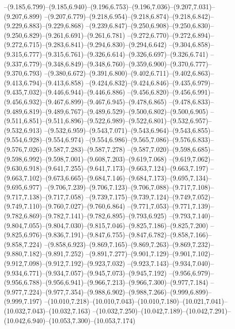   --(9.185,6.799)--(9.185,6.940)--(9.196,6.753)--(9.196,7.036)--(9.207,7.031)--(9.207,6.899)%
  --(9.207,6.779)--(9.218,6.954)--(9.218,6.874)--(9.218,6.842)--(9.229,6.883)--(9.229,6.868)%
  --(9.239,6.847)--(9.250,6.908)--(9.250,6.830)--(9.250,6.829)--(9.261,6.691)--(9.261,6.781)%
  --(9.272,6.770)--(9.272,6.894)--(9.272,6.715)--(9.283,6.841)--(9.294,6.830)--(9.294,6.642)%
  --(9.304,6.858)--(9.315,6.777)--(9.315,6.761)--(9.326,6.614)--(9.326,6.697)--(9.326,6.741)%
  --(9.337,6.779)--(9.348,6.849)--(9.348,6.760)--(9.359,6.900)--(9.370,6.777)--(9.370,6.793)%
  --(9.380,6.672)--(9.391,6.800)--(9.402,6.711)--(9.402,6.863)--(9.413,6.794)--(9.413,6.858)%
  --(9.424,6.832)--(9.424,6.846)--(9.435,6.979)--(9.435,7.032)--(9.446,6.944)--(9.446,6.886)%
  --(9.456,6.820)--(9.456,6.991)--(9.456,6.932)--(9.467,6.899)--(9.467,6.945)--(9.478,6.865)%
  --(9.478,6.833)--(9.489,6.819)--(9.489,6.767)--(9.489,6.529)--(9.500,6.802)--(9.500,6.905)%
  --(9.511,6.851)--(9.511,6.896)--(9.522,6.989)--(9.522,6.801)--(9.532,6.957)--(9.532,6.913)%
  --(9.532,6.959)--(9.543,7.071)--(9.543,6.964)--(9.543,6.855)--(9.554,6.928)--(9.554,6.974)%
  --(9.554,6.986)--(9.565,7.086)--(9.576,6.833)--(9.576,7.026)--(9.587,7.283)--(9.587,7.278)%
  --(9.587,7.020)--(9.598,6.685)--(9.598,6.992)--(9.598,7.001)--(9.608,7.203)--(9.619,7.068)%
  --(9.619,7.062)--(9.630,6.918)--(9.641,7.255)--(9.641,7.173)--(9.663,7.124)--(9.663,7.197)%
  --(9.663,7.102)--(9.673,6.665)--(9.684,7.146)--(9.684,7.173)--(9.695,7.134)--(9.695,6.977)%
  --(9.706,7.239)--(9.706,7.123)--(9.706,7.088)--(9.717,7.108)--(9.717,7.138)--(9.717,7.058)%
  --(9.739,7.175)--(9.739,7.124)--(9.749,7.052)--(9.749,7.110)--(9.760,7.027)--(9.760,6.864)%
  --(9.771,7.053)--(9.771,7.139)--(9.782,6.869)--(9.782,7.141)--(9.782,6.895)--(9.793,6.925)%
  --(9.793,7.140)--(9.804,7.055)--(9.804,7.030)--(9.815,7.046)--(9.825,7.186)--(9.825,7.200)%
  --(9.825,6.976)--(9.836,7.191)--(9.847,6.755)--(9.847,6.782)--(9.858,7.166)--(9.858,7.224)%
  --(9.858,6.923)--(9.869,7.165)--(9.869,7.263)--(9.869,7.232)--(9.880,7.182)--(9.891,7.252)%
  --(9.891,7.277)--(9.901,7.129)--(9.901,7.102)--(9.912,7.098)--(9.912,7.192)--(9.923,7.032)%
  --(9.923,7.143)--(9.934,7.040)--(9.934,6.771)--(9.934,7.057)--(9.945,7.073)--(9.945,7.192)%
  --(9.956,6.979)--(9.956,6.788)--(9.956,6.941)--(9.966,7.213)--(9.966,7.300)--(9.977,7.184)%
  --(9.977,7.224)--(9.977,7.354)--(9.988,6.902)--(9.988,7.266)--(9.999,6.899)--(9.999,7.197)%
  --(10.010,7.218)--(10.010,7.043)--(10.010,7.180)--(10.021,7.041)--(10.032,7.043)--(10.032,7.163)%
  --(10.032,7.250)--(10.042,7.189)--(10.042,7.291)--(10.042,6.940)--(10.053,7.300)--(10.053,7.174)%
